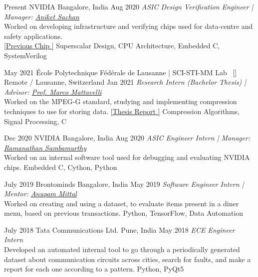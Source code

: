 \begin{experiences}
\researchexperience
    {Present}
    {NVIDIA}
    {Bangalore, India} {}
    {Aug 2020}
    {\textit{ASIC Design Verification Engineer | Manager:  \href{https://in.linkedin.com/in/aniketsachan}{Aniket Sachan}}\\
    Worked on developing infrastructure and verifying chips used for data-centre and safety applications.\\ \href{https://developer.nvidia.com/blog/nvidia-grace-hopper-superchip-architecture-in-depth}{[Previous Chip \websiteSymbol]}
    }
    {Superscalar Design, CPU Architecture, Embedded C, SystemVerilog}
\emptySeparator

\researchexperience
    {May 2021}
    {École Polytechnique Fédérale de Lausanne | SCI-STI-MM Lab{\normalfont  ~ [\href{https://www.epfl.ch/labs/gramm/}{\small{\websiteSymbol}}]}}
    {Remote / Lausanne, Switzerland} {}
    {Jan 2021}
    {\textit{Research Intern (Bachelor Thesis) | Advisor:  \href{https://people.epfl.ch/marco.mattavelli?lang=en}{Prof. Marco Mattavelli}}\\
    Worked on the MPEG-G standard, studying and implementing compression techniques to use for storing data. \href{https://drive.google.com/file/d/1ciOquc6fPDTNNzcOwI5xbCi7ndL3qIKI/view?usp=sharing}{[Thesis Report \pdfFileSymbol]}
    }
    {Compression Algorithms, Signal Processing, C}
\emptySeparator

\researchexperience
    {Dec 2020}
    {NVIDIA}
    {Bangalore, India} {}
    {Aug 2020}
    {\textit{ASIC Engineer Intern | Manager:  \href{https://www.linkedin.com/in/ramanathan-sambamurthy-4540b9168}{Ramanathan Sambamurthy}}\\
    Worked on an internal software tool used for debugging and evaluating NVIDIA chips.
    }
    {Embedded C, Cython, Python }
\emptySeparator

\researchexperience
    {July 2019}
    {Brontominds}
    {Bangalore, India} {}
    {May 2019}
    {\textit{Software Engineer Intern | Mentor:  \href{https://in.linkedin.com/in/anupammittal}{Anupam Mittal}}\\
    Worked on creating and using a dataset, to evaluate items present in a diner menu, based on previous transactions.
    }
    {Python, TensorFlow, Data Automation}
\emptySeparator

\researchexperience
    {July 2018}
    {Tata Communications Ltd.}
    {Pune, India} {}
    {May 2018}
    {\textit{ECE Engineer Intern}\\
    Developed an automated internal tool to go through a periodically generated dataset about communication circuits across cities, search for faults, and make a report for each one according to a pattern.
    }
    {Python, PyQt5}
  
\end{experiences}
\vspace{-2mm}
